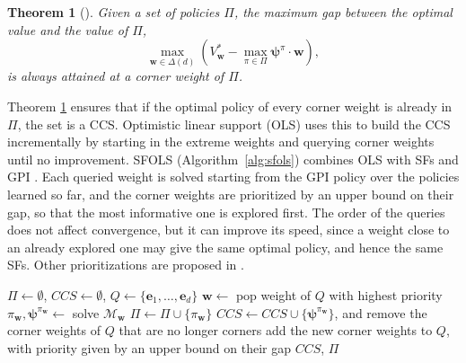 \documentclass[11pt]{article}
\newcommand{\vpsi}{\bm{\psi}}      %
\newtheorem{theorem}{Theorem}
\begin{document}
\begin{theorem}[\cite{roijers_multi-objective_2016}]\label{thm:corner}
    Given a set of policies $\Pi$, the maximum gap between the optimal value and the value of $\Pi$,
    \begin{equation}
        \max_{\mathbf{w} \in \Delta(d)} \left( V^*_{\mathbf{w}} - \max_{\pi \in \Pi} \vpsi^\pi \cdot \mathbf{w} \right),
    \end{equation}
    is always attained at a corner weight of $\Pi$.
\end{theorem}

Theorem \ref{thm:corner} ensures that if the optimal policy of every corner weight is already in $\Pi$, the set is a CCS. Optimistic linear support (OLS) \cite{roijers_multi-objective_2016} uses this to build the CCS incrementally by starting in the extreme weights and querying corner weights until no improvement. SFOLS (Algorithm~\ref{alg:sfols}) combines OLS with SFs and GPI \cite{alegre_optimistic_2022}. Each queried weight is solved starting from the GPI policy over the policies learned so far, and the corner weights are prioritized by an upper bound on their gap, so that the most informative one is explored first. The order of the queries does not affect convergence, but it can improve its speed, since a weight close to an already explored one may give the same optimal policy, and hence the same SFs. Other prioritizations are proposed in \cite{alegre_sample-efficient_2023}.

\begin{algorithm}[H]
\caption{SFOLS \cite{alegre_optimistic_2022}}\label{alg:sfols}
\begin{algorithmic}[1]
\State $\Pi \gets \emptyset$, $CCS \gets \emptyset$, $Q \gets \{\mathbf{e}_1, \dots, \mathbf{e}_d\}$ 
    \State $\mathbf{w} \gets$ pop weight of $Q$ with highest priority
    \State $\pi_{\mathbf{w}}, \vpsi^{\pi_{\mathbf{w}}} \gets$ solve $\mathcal{M}_{\mathbf{w}}$ \label{alg:sfols-solve}
    \State $\Pi \gets \Pi \cup \{\pi_{\mathbf{w}}\}$
    \If{$\vpsi^{\pi_{\mathbf{w}}} \notin CCS$ and it improves $\max_{\pi \in \Pi}\vpsi^\pi \cdot \mathbf{w}$}
        \State $CCS \gets CCS \cup \{\vpsi^{\pi_{\mathbf{w}}}\}$, and remove the corner weights of $Q$ that are no longer corners
        \State add the new corner weights to $Q$, with priority given by an upper bound on their gap
    \EndIf
\EndWhile
\State \Return $CCS$, $\Pi$
\end{algorithmic}
\end{algorithm}
\end{document}

